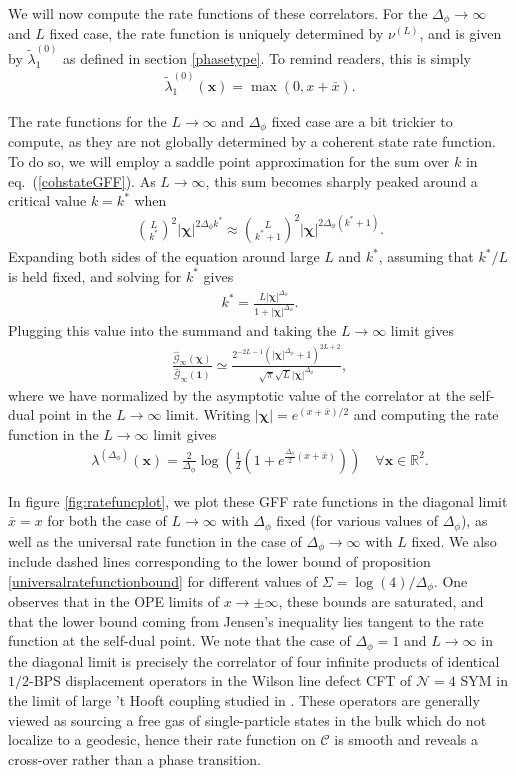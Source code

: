 \documentclass[a4paper,11pt]{article}
\theoremstyle{plain}
\theoremstyle{definition}
\theoremstyle{remark}
\newcommand{\bs}[1]{\boldsymbol{#1}}
\newcommand{\ba}{\begin{equation} \begin{aligned}}
\newcommand{\ea}{\end{aligned} \end{equation}}
\newcommand{\Df}{\Delta_\phi}
\begin{document}
 We will now compute the rate functions of these correlators. For the $\Df\to\infty$ and $L$ fixed case, the rate function is uniquely determined by $\nu^{(L)}$, and is given by  $\tilde{\lambda}_1^{(0)}$ as defined in section \ref{phasetype}. To remind readers, this is simply
\ba
\tilde{\lambda}^{(0)}_1(\bs{x}) = \max(0,x+\bar{x}).
\ea

The rate functions for the $L\to\infty$ and $\Df$ fixed case are a bit trickier to compute, as they are not globally determined by a coherent state rate function. To do so, we will employ a saddle point approximation for the sum over $k$ in eq.~(\ref{cohstateGFF}). As $L \to \infty$, this sum becomes sharply peaked around a critical value $k = k^*$ when
\ba
\binom{L}{k^*}^2|\bs{\chi}|^{2\Df k^*} \approx \binom{L}{k^*+1}^2|\bs{\chi}|^{2\Df (k^*+1)}.
\ea
Expanding both sides of the equation around large $L$ and $k^*$, assuming that $k^*/L$ is held fixed, and solving for $k^*$ gives
\ba
k^{*} = \frac{L|\bs{\chi}|^{\Df} }{1+|\bs{\chi}|^{\Df} }.
\ea
Plugging this value into the summand and taking the $L\to\infty$ limit gives
\ba
\label{saddlepointapproxofGFFcorr}
\frac{\widehat{\mathcal{G}}_\infty(\bs{\chi})}{\widehat{\mathcal{G}}_\infty(\bs{1}) } \simeq \frac{2^{-2 L-1} \left(|\bs{\chi}|^{\Df}+1\right)^{2 L+2}}{\sqrt{\pi } \sqrt{L} |\bs{\chi}|^{\Df}},
\ea
where we have normalized by the asymptotic value of the correlator at the self-dual point in the $L\to\infty$ limit. Writing $|\bs{\chi}| = e^{(x+\bar{x})/2}$ and computing the rate function in the $L\to\infty$ limit gives
\ba
\lambda^{(\Df)}(\bs{x}) = \frac{2}{\Df} \log\left(\frac{1}{2} \left( 1 + e^{\frac{\Df}{2}(x + \bar{x}) } \right) \right) \quad \forall \bs{x} \in \mathbb{R}^2.
\ea

In figure \ref{fig:ratefuncplot}, we plot these GFF rate functions in the diagonal limit $\bar{x} = x$ for both the case of $L\to\infty$ with $\Df$ fixed (for various values of $\Df$), as well as the universal rate function in the case of $\Df\to\infty$ with $L$ fixed. We also include dashed lines corresponding to the lower bound of proposition \ref{universalratefunctionbound} for different values of $\Sigma = \log(4)/\Df$. One observes that in the OPE limits of $x \to \pm \infty$, these bounds are saturated, and that the lower bound coming from Jensen's inequality lies tangent to the rate function at the self-dual point. We note that the case of $\Df =1$ and $L\to \infty$ in the diagonal limit is precisely the correlator of four infinite products of identical $1/2$-BPS displacement operators in the Wilson line defect CFT of $\mathcal{N}=4$ SYM in the limit of large 't Hooft coupling studied in \cite{ferrero2}. These operators are generally viewed as sourcing a free gas of single-particle states in the bulk which do not localize to a geodesic, hence their rate function on $\mathscr{C}$ is smooth and reveals a cross-over rather than a phase transition.
\end{document}
